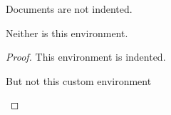 \documentclass{article}
\begin{document}
Documents are not indented.

\begin{mydocument}

Neither is this environment.

\begin{proof}

  This environment is indented.

  \begin{myproof}

  But not this custom environment

  \end{myproof}

\end{proof}

\end{mydocument}
\end{document}

